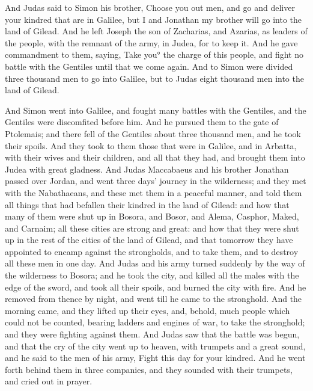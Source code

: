 {And Judas said to Simon his brother, Choose you out men, and go and deliver your kindred that are in Galilee, but I and Jonathan my brother will go into the land of Gilead.
And he left Joseph the son of Zacharias, and Azarias, as leaders of the people, with the remnant of the army, in Judea, for to keep it.
And he gave commandment to them, saying, Take you° the charge of this people, and fight no battle with the Gentiles until that we come again.
And to Simon were divided three thousand men to go into Galilee, but to Judas eight thousand men
{} into the land of Gilead.
\par }{\PP {}And Simon went into Galilee, and fought many battles with the Gentiles, and the Gentiles were discomfited before him.
And he pursued them to the gate of Ptolemais; and there fell of the Gentiles about three thousand men, and he took their spoils.
And they took to them those that were in Galilee, and in Arbatta, with their wives and their children, and all that they had, and brought them into Judea with great gladness.
And Judas Maccabaeus and his brother Jonathan passed over Jordan, and went three days’ journey in the wilderness;
and they met with the Nabathaeans, and these met them in a peaceful manner, and told them all things that had befallen their kindred in the land of Gilead:
and how that many of them were shut up in Bosora, and Bosor, and Alema,
 Casphor, Maked, and
 Carnaim; all these cities are strong and great:
and how that they were shut up in the rest of the cities of the land of Gilead, and that tomorrow they have appointed to encamp against the strongholds, and to take them, and to destroy all these men in one day.
And Judas and his army turned suddenly by the way of the wilderness to Bosora; and he took the city, and killed all the males with the edge of the sword, and took all their spoils, and burned the city with fire.
And he removed from thence by night, and went till he came to the stronghold.
And the morning came, and they lifted up their eyes, and, behold, much people which could not be counted, bearing ladders and engines of war, to take the stronghold; and they were fighting against them.
And Judas saw that the battle was begun, and that the cry of the city went up to heaven, with trumpets and a great sound,
and he said to the men of his army, Fight this day for your kindred.
And he went forth behind them in three companies, and they sounded with their trumpets, and cried out in prayer.
}
